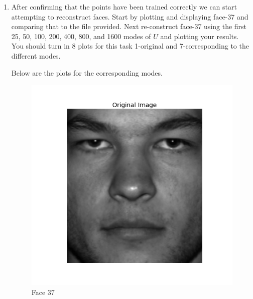 \begin{enumerate}[label=\arabic*.]
    \item After confirming that the points have been trained correctly we
        can start attempting to reconstruct faces. Start by plotting and
        displaying face-37 and comparing that to the file provided. Next
        re-construct face-37 using the first 25, 50, 100, 200, 400, 800,
        and 1600 modes of $U$ and plotting your results. You should turn in
        8 plots for this task 1-original and 7-corresponding to the
        different modes. 
            \begin{mdframed}[style=MyFrame]
                Below are the plots for the corresponding modes.
                \begin{figure}[H]
                    \includegraphics[height=0.35\textheight]{../media/original-image-1.png}
                    \caption{Face 37}
                \end{figure}
                \begin{figure}[H]

\end{figure}
\end{mdframed}
\end{enumerate}
